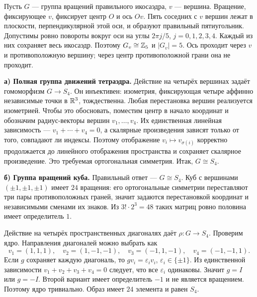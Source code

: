
Пусть $G$ --- группа вращений правильного икосаэдра, $v$ --- вершина.
Вращение, фиксирующее $v$, фиксирует центр $O$ и ось $Ov$.
Пять соседних с $v$ вершин лежат в плоскости, перпендикулярной
этой оси, и образуют правильный пятиугольник.
Допустимы ровно повороты вокруг оси на углы $2\pi j/5$,
$j=0,1,2,3,4$. Каждый из них сохраняет весь икосаэдр.
Поэтому $G_v\cong\mathbb{Z}_5$ и $|G_v|=5$.
Ось проходит через $v$ и противоположную вершину;
через центр противоположной грани она не проходит.

\textbf{а) Полная группа движений тетраэдра.}
Действие на четырёх вершинах задаёт гомоморфизм $G\to S_4$.
Он инъективен: изометрия, фиксирующая четыре аффинно независимые
точки в $\mathbb{R}^3$, тождественна.
Любая перестановка вершин реализуется изометрией.
Чтобы это обосновать, поместим центр в начало координат и обозначим
радиус-векторы вершин $v_1,\dots,v_4$.
Их единственная линейная зависимость --- $v_1+\cdots+v_4=0$,
а скалярные произведения зависят только от того,
совпадают ли индексы. Поэтому отображение
$v_i\mapsto v_{\sigma(i)}$ корректно продолжается до линейного
отображения пространства и сохраняет скалярное произведение.
Это требуемая ортогональная симметрия. Итак, $G\cong S_4$.

\textbf{б) Группа вращений куба.}
Правильный ответ --- $G\cong S_4$.
Куб с вершинами $(\pm1,\pm1,\pm1)$ имеет $24$ вращения:
его ортогональные симметрии переставляют три пары противоположных
граней, значит задаются перестановкой координат и независимыми
сменами их знаков. Из $3!\cdot2^3=48$ таких матриц ровно половина
имеет определитель $1$.

Действие на четырёх пространственных диагоналях даёт
$\rho:G\to S_4$. Проверим ядро. Направления диагоналей можно выбрать как
\[
 v_1=(1,1,1),\quad v_2=(1,-1,-1),\quad
 v_3=(-1,1,-1),\quad v_4=(-1,-1,1).
\]
Если $g$ сохраняет каждую диагональ, то $gv_i=\varepsilon_i v_i$,
$\varepsilon_i\in\{\pm1\}$. Из единственной зависимости
$v_1+v_2+v_3+v_4=0$ следует, что все $\varepsilon_i$ одинаковы.
Значит $g=I$ или $g=-I$. Второй вариант имеет определитель $-1$
и не является вращением. Поэтому ядро тривиально.
Образ имеет $24$ элемента и равен $S_4$.


